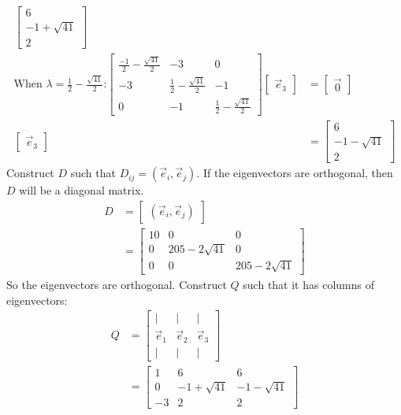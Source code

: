 \documentclass[11pt]{homework}
\begin{document}
\begin{align*}
\begin{bmatrix}
  6 \\  
  -1 + \sqrt{41} \\
  2
  \end{bmatrix} \\
  \text{When $\lambda = \frac{1}{2} - \frac{\sqrt{41}}{2}$:}
  \begin{bmatrix}
  \frac{-1}{2} - \frac{\sqrt{41}}{2} & -3 & 0 \\
  -3 & \frac{1}{2} - \frac{\sqrt{41}}{2} & -1 \\
  0 & -1 & \frac{1}{2} - \frac{\sqrt{41}}{2}
  \end{bmatrix}
  \begin{bmatrix}
    \vec e_3
  \end{bmatrix}
  &= 
  \begin{bmatrix}
    \vec 0
  \end{bmatrix} \\
  \begin{bmatrix}
    \vec e_3
  \end{bmatrix}
  &= 
  \begin{bmatrix}
  6 \\  
  -1 - \sqrt{41} \\
  2
  \end{bmatrix} 
\end{align*}
Construct $D$ such that $D_{ij} = (\vec e_i, \vec e_j)$. 
If the eigenvectors are orthogonal, 
then $D$ will be a diagonal matrix.
\begin{align*}
D &= 
  \begin{bmatrix}
  (\vec e_i, \vec e_j)
  \end{bmatrix} \\
  &=
  \begin{bmatrix}
  10 & 0 & 0 \\ 
  0 & 205-2\sqrt{41} & 0 \\
  0 & 0 & 205 - 2\sqrt{41}
  \end{bmatrix}
\end{align*}
So the eigenvectors are orthogonal.
Construct $Q$ such that it has
columns of eigenvectors:
\begin{align*}
Q &= 
  \begin{bmatrix}
  | & | & |  \\
  \vec e_1 & \vec e_2 & \vec e_3 \\
  | & | & |
  \end{bmatrix}\\
  &=
  \begin{bmatrix}
  1 & 6 & 6 \\
  0 & -1+\sqrt{41} & -1-\sqrt{41} \\
  -3 & 2 & 2
  \end{bmatrix}
\end{align*}
\end{document}

